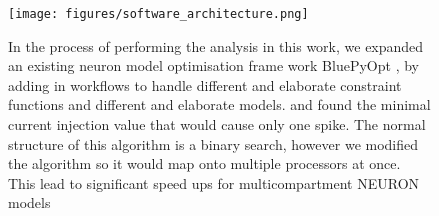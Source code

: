   

\begin{figure}    
\begin{center}
\texttt{[image: figures/software\_architecture.png]}
\caption{In the process of performing the analysis in this work, we expanded an existing neuron model optimisation frame work BluePyOpt \cite{bluepyopt}, by adding in workflows to handle different and elaborate constraint functions and different and elaborate models. and found the minimal current injection value that would cause only one spike. The normal structure of this algorithm is a binary search, however we modified the algorithm so it would map onto multiple processors at once. This lead to significant speed ups for multicompartment NEURON models}

\end{center}
\end{figure}